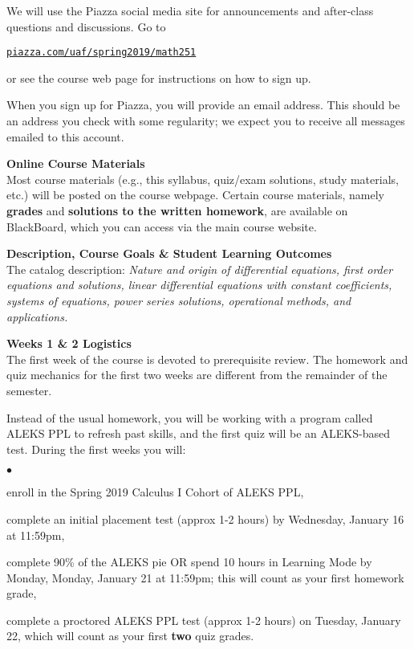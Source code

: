 \documentclass[12pt]{article}
\renewcommand{\emph}[1]{\textsf{\textbf{#1}}}
\newcommand{\localhead}[1]{\par\smallskip\textbf{#1}\nobreak\\}%
\def\heading#1{\localhead{\large\emph{#1}}}
\newenvironment{clist}%
{\bgroup\parskip 0pt\begin{list}{$\bullet$}{\partopsep 4pt\topsep 0pt\itemsep -2pt}}%
{\end{list}\egroup}%
\begin{document}
We will use the Piazza social media site for announcements and after-class questions and discussions.  Go to

\centerline{\href{https://piazza.com/uaf/spring2019/math251}{\tt piazza.com/uaf/spring2019/math251}}

\noindent or see the course web page for instructions on how to sign up.

When you sign up for Piazza, you will provide an email address. This should be an address you check with some regularity; we expect you to receive all messages emailed to this account.

\heading{Online Course Materials}
Most course materials (e.g., this syllabus, quiz/exam solutions, study materials, etc.) will be posted on the course webpage.  Certain course materials, namely \emph{grades} and \emph{solutions to the written homework}, are available on BlackBoard, which you can access via the main course website.

\heading{Description, Course Goals \& Student Learning Outcomes}
The catalog description: \textsl{Nature and origin of differential equations, first order equations and solutions, linear differential equations with constant coefficients, systems of equations, power series solutions, operational methods, and applications.}


\heading{Weeks 1 \& 2 Logistics}
The first week of the course is devoted to prerequisite review.  The homework and quiz mechanics for the first two weeks are different from the remainder of the semester.

Instead of the usual homework, you will be working with a program called ALEKS PPL to refresh past skills, and the first quiz will be an ALEKS-based test.  During the first weeks you will:

\begin{clist}
\item enroll in the Spring 2019 Calculus I Cohort of ALEKS PPL,
\item complete an initial placement test (approx 1-2 hours) by Wednesday, January 16 at 11:59pm,
\item complete 90\% of the ALEKS pie \: OR \: spend 10 hours in Learning Mode by Monday, Monday, January 21 at 11:59pm; this will count as your first homework grade,
\item complete a proctored ALEKS PPL test (approx 1-2 hours) on Tuesday, January 22, which will count as your first \textbf{two} quiz grades.
\end{clist}
\end{document}

